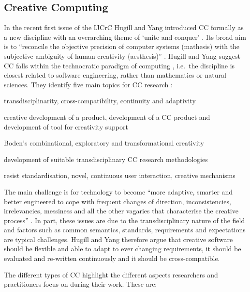 \subsection{Creative Computing}
\label{s:creacomp}

In the recent first issue of the \ac{IJCrC} Hugill and Yang introduced \acf{CC} formally as a new discipline \autocite*{Hugill2013c} with an overarching theme of `unite and conquer' \autocite{Yang2013}. Its broad aim is to ``reconcile the objective precision of computer systems (mathesis) with the subjective ambiguity of human creativity (aesthesis)'' \autocite{Hugill2013c}. Hugill and Yang suggest \ac{CC} falls within the technocratic paradigm of computing \autocite[see also]{Eden2007}, i.e.\ the discipline is closest related to software engineering, rather than mathematics or natural sciences. They identify five main topics for \ac{CC} research \autocite*{Hugill2013c}:

\begin{description}[leftmargin=2.6cm]
  \item [Challenges] transdisciplinarity, cross-compatibility, continuity and adaptivity
  \item [Types] creative development of a product, development of a \ac{CC} product and development of tool for creativity support
  \item [Mechanisms]	Boden’s combinational, exploratory and transformational creativity
  \item [Methods] development of suitable transdisciplinary \ac{CC} research methodologies
  \item [Standards] resist standardisation, novel, continuous user interaction, creative mechanisms
\end{description}

The main challenge is for technology  to become ``more adaptive, smarter and better engineered to cope with frequent changes of direction, inconsistencies, irrelevancies, messiness and all the other vagaries that characterise the creative process'' \autocite{Hugill2013c}. In part, these issues are due to the transdisciplinary nature of the field and factors such as common semantics, standards, requirements and expectations are typical challenges. Hugill and Yang therefore argue that creative software should be flexible and able to adapt to ever changing requirements, it should be evaluated and re-written continuously and it should be cross-compatible.

The different types of \ac{CC} highlight the different aspects researchers and practitioners focus on during their work. These are:

